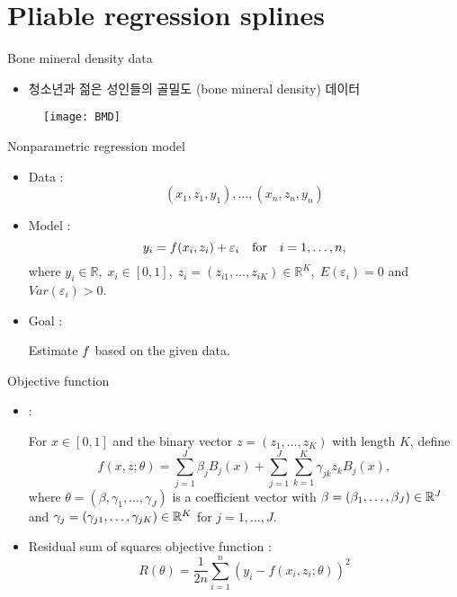 \section{Pliable regression splines}
\begin{frame}{Bone mineral density data}
\begin{itemize}
\item 청소년과 젊은 성인들의 골밀도 (bone mineral density) 데이터
\end{itemize}
\begin{figure}
\texttt{[image: BMD]}
\end{figure}
\end{frame}

\begin{frame}{Nonparametric regression model}
\begin{itemize}
\item Data :
$$
(x_1, z_1, y_1), \ldots, (x_n, z_n, y_n)
$$
\vspace{3mm}
\item Model :
$$
y_i = \mathnormal{f}(x_i, z_i) + \varepsilon_i \quad \mbox{for} \quad i = 1, \ldots, n,
$$
where $y_i \in \mathbb{R}, \; x_i \in [0,1], \; z_i = (z_{i1}, \ldots, z_{iK}) \in \mathbb{R}^K, \; E(\varepsilon_i) = 0$ and $Var(\varepsilon_i) > 0$.
\vspace{3mm}
\item Goal : 
\begin{center}
Estimate $\mathnormal{f}$ based on the given data.
\end{center}
\end{itemize}
\end{frame}

\begin{frame}{Objective function}
\begin{itemize}
\item {} :

For $x \in [0,1]$ and the binary vector $ z = (z_1, \ldots, z_K)$
with length $K$, define
$$
f(x, z;\theta) = \sum_{j=1}^J \beta_j B_j(x) + \sum_{j=1}^J \sum_{k=1}^K \gamma_{jk} z_k B_j(x),
$$
where 
$\theta = (\beta, \gamma_1, \ldots, \gamma_J)$ is a coefficient vector with
$\beta = (\beta_1, \ldots, \beta_J) \in \mathbb{R}^J$ and
$\gamma_j = (\gamma_{j1}, \ldots, \gamma_{jK}) \in \mathbb{R}^K$
for $j = 1, \ldots, J$. 
\vspace{3mm}
\item Residual sum of squares objective function :
$$
R(\theta) = \frac{1}{2n}\sum_{i=1}^n (y_i - f(x_i, z_i;\theta))^2
$$
\end{itemize}
\end{frame}

